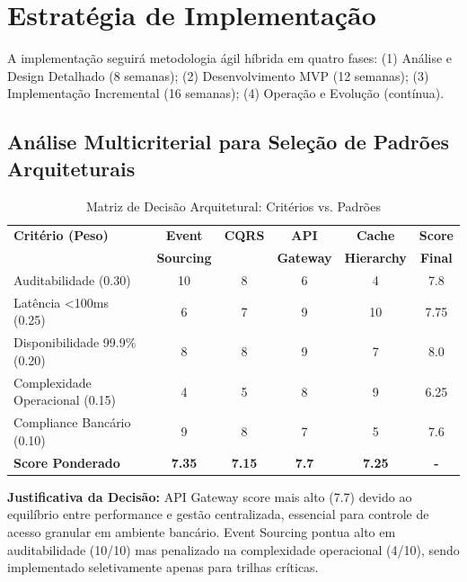 \section{Estratégia de Implementação}

A implementação seguirá metodologia ágil híbrida em quatro fases: (1) Análise e Design Detalhado (8 semanas); (2) Desenvolvimento MVP (12 semanas); (3) Implementação Incremental (16 semanas); (4) Operação e Evolução (contínua).

\subsection{Análise Multicriterial para Seleção de Padrões Arquiteturais}

\begin{table}[h]
\centering
\caption{Matriz de Decisão Arquitetural: Critérios vs. Padrões}
\label{tab:matriz-decisao-arquitetural}
\footnotesize
\begin{tabular}{|l|c|c|c|c|c|}
\hline
\rowcolor{azulPrincipal!10}
\textbf{Critério (Peso)} & \textbf{Event} & \textbf{CQRS} & \textbf{API} & \textbf{Cache} & \textbf{Score}\\
\textbf{} & \textbf{Sourcing} & \textbf{} & \textbf{Gateway} & \textbf{Hierarchy} & \textbf{Final}\\
\hline
\rowcolor{azulSecundario!5}
Auditabilidade (0.30) & 10 & 8 & 6 & 4 & 7.8 \\
\hline
Latência <100ms (0.25) & 6 & 7 & 9 & 10 & 7.75 \\
\hline
\rowcolor{azulSecundario!5}
Disponibilidade 99.9\% (0.20) & 8 & 8 & 9 & 7 & 8.0 \\
\hline
Complexidade Operacional (0.15) & 4 & 5 & 8 & 9 & 6.25 \\
\hline
\rowcolor{azulSecundario!5}
Compliance Bancário (0.10) & 9 & 8 & 7 & 5 & 7.6 \\
\hline
\textbf{Score Ponderado} & \textbf{7.35} & \textbf{7.15} & \textbf{7.7} & \textbf{7.25} & \textbf{-} \\
\hline
\end{tabular}
\end{table}

\textbf{Justificativa da Decisão:} API Gateway score mais alto (7.7) devido ao equilíbrio entre performance e gestão centralizada, essencial para controle de acesso granular em ambiente bancário. Event Sourcing pontua alto em auditabilidade (10/10) mas penalizado na complexidade operacional (4/10), sendo implementado seletivamente apenas para trilhas críticas.

